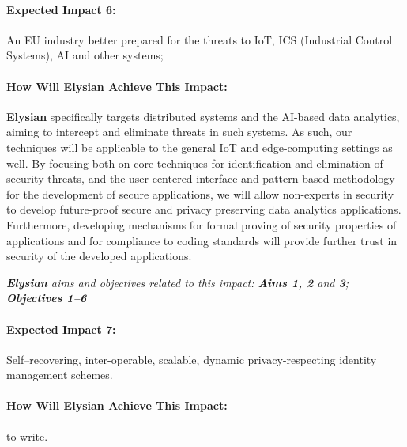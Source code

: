 \documentclass[a4paper,11pt]{article}
\newcommand{\project}[1]{\textbf{#1}\xspace}
\newcommand{\SECURITY}{\project{Elysian}}
\newcommand{\TheProject}{\SECURITY}
\begin{document}
\begin{mdframed}[backgroundcolor=blue!5]
\paragraph{Expected Impact 6:}
An EU industry better prepared for the threats to IoT, ICS (Industrial Control Systems), AI and other systems;
\end{mdframed}

\begin{mdframed}[backgroundcolor=gray!10]
\paragraph{How Will \TheProject{} Achieve This Impact:}
\TheProject{} specifically targets distributed systems and the AI-based data analytics, aiming to intercept and eliminate threats in such systems. As such, our techniques will be applicable to the general IoT and edge-computing settings as well. By focusing both on core techniques for identification and elimination of security threats, and the user-centered interface and pattern-based methodology for the development of secure applications, we will allow non-experts in security to develop future-proof secure and privacy preserving data analytics applications. Furthermore, developing mechanisms for formal proving of security properties of applications and for compliance to coding standards will provide further trust in security of the developed applications.

\emph{\TheProject{} aims and objectives related to this impact: \textbf{Aims 1, 2}  and \textbf{3}; \textbf{Objectives 1--6} }

\end{mdframed}

\begin{mdframed}[backgroundcolor=blue!5]
\paragraph{Expected Impact 7:}
Self–recovering, inter-operable, scalable, dynamic privacy-respecting identity management schemes.
\end{mdframed}

\begin{mdframed}[backgroundcolor=gray!10]
\paragraph{How Will \TheProject{} Achieve This Impact:}
\COGNI to write.
\end{mdframed}
\end{document}
